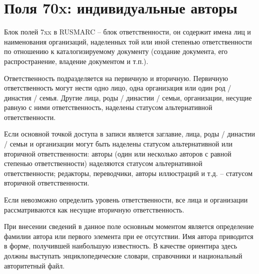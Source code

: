 \chapter{Поля 70x: индивидуальные авторы}

Блок полей 7xx в RUSMARC  -- блок ответственности, он содержит имена лиц и наименования организаций, наделенных той или иной степенью ответственности по отношению к каталогизируемому документу (создание документа, его распространение, владение документом и т.п.).

Ответственность подразделяется на первичную и вторичную. Первичную ответственность могут нести одно лицо, одна организация или один род / династия / семья. Другие лица, роды / династии / семьи, организации, несущие равную с ними ответственность, наделены статусом альтернативной ответственности.

Если основной точкой доступа в записи является заглавие, лица, роды / династии / семьи и организации могут быть наделены статусом альтернативной или вторичной ответственности: авторы (один или несколько авторов с равной степенью ответственности) наделяются статусом альтернативной ответственности; редакторы, переводчики, авторы иллюстраций и т.д. -- статусом вторичной ответственности.

Если невозможно определить уровень ответственности, все лица и организации рассматриваются как несущие вторичную ответственность.

При внесении сведений в данное поле основным моментом является определение фамилии автора или первого элемента при ее отсутствии. Имя автора приводится в форме, получившей наибольшую известность. В качестве ориентира здесь должны выступать энциклопедические словари, справочники и национальный авторитетный файл.
